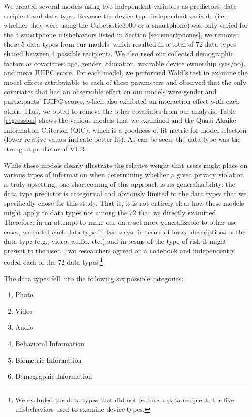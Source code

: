 We created several models using two independent variables as predictors: data recipient and data type. Because the device type independent variable (i.e., whether they were using the Cubetastic3000 or a smartphone) was only varied for the 5 smartphone misbehaviors listed in Section \ref{sec:smartphones}, we removed these 5 data types from our models, which resulted in a total of 72 data types shared between 4 possible recipients. We also used our collected demographic factors as covariates: age, gender, education, wearable device ownership (yes/no), and mean IUIPC score. For each model, we performed Wald's test to examine the model effects attributable to each of these parameters and observed that the only covariates that had an observable effect on our models were gender and participants' IUIPC scores, which also exhibited an interaction effect with each other. Thus, we opted to remove the other covariates from our analysis. Table \ref{regression} shows the various models that we examined and the Quasi-Akaike Information Criterion (QIC), which is a goodness-of-fit metric for model selection (lower relative values indicate better fit). As can be seen, the data type was the strongest predictor of VUR.

While these models clearly illustrate  the relative weight that users might place on various types of information when determining whether a given privacy violation is truly upsetting, one shortcoming of this approach is its generalizability: the data type predictor is categorical and obviously limited to the data types that we specifically chose for this study. That is, it is not entirely clear how these models might apply to data types not among the 72 that we directly examined. Therefore, in an attempt to make our data set more generalizable to other use cases, we coded each data type in two ways: in terms of broad descriptions of the data type (e.g., video, audio, etc.) and in terms of the type of risk it might present to the user. Two researchers agreed on a codebook and independently coded each of the 72 data types.\footnote{We excluded the data types that did not feature a data recipient, the five misbehaviors used to examine device types.}

The data types fell into the following six possible categories:
\begin{enumerate}[topsep=0pt,itemsep=-1ex,partopsep=1ex,parsep=1ex]
\item Photo
\item Video
\item Audio
\item Behavioral Information
\item Biometric Information
\item Demographic Information
\end{enumerate}

